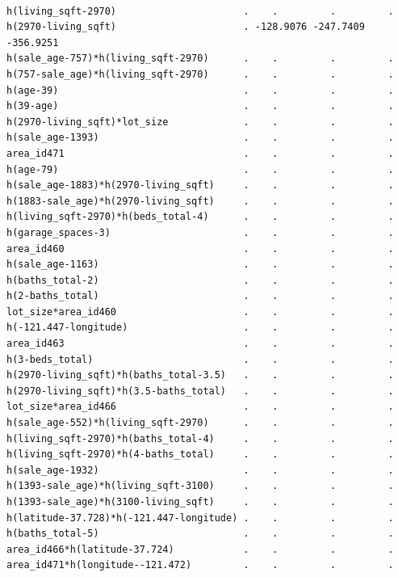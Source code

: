 \documentclass[
]{article}
\begin{document}
\begin{verbatim}
                                                                        
h(living_sqft-2970)                      .    .         .         .     
h(2970-living_sqft)                      . -128.9076 -247.7409 -356.9251
h(sale_age-757)*h(living_sqft-2970)      .    .         .         .     
h(757-sale_age)*h(living_sqft-2970)      .    .         .         .     
h(age-39)                                .    .         .         .     
h(39-age)                                .    .         .         .     
h(2970-living_sqft)*lot_size             .    .         .         .     
h(sale_age-1393)                         .    .         .         .     
area_id471                               .    .         .         .     
h(age-79)                                .    .         .         .     
h(sale_age-1883)*h(2970-living_sqft)     .    .         .         .     
h(1883-sale_age)*h(2970-living_sqft)     .    .         .         .     
h(living_sqft-2970)*h(beds_total-4)      .    .         .         .     
h(garage_spaces-3)                       .    .         .         .     
area_id460                               .    .         .         .     
h(sale_age-1163)                         .    .         .         .     
h(baths_total-2)                         .    .         .         .     
h(2-baths_total)                         .    .         .         .     
lot_size*area_id460                      .    .         .         .     
h(-121.447-longitude)                    .    .         .         .     
area_id463                               .    .         .         .     
h(3-beds_total)                          .    .         .         .     
h(2970-living_sqft)*h(baths_total-3.5)   .    .         .         .     
h(2970-living_sqft)*h(3.5-baths_total)   .    .         .         .     
lot_size*area_id466                      .    .         .         .     
h(sale_age-552)*h(living_sqft-2970)      .    .         .         .     
h(living_sqft-2970)*h(baths_total-4)     .    .         .         .     
h(living_sqft-2970)*h(4-baths_total)     .    .         .         .     
h(sale_age-1932)                         .    .         .         .     
h(1393-sale_age)*h(living_sqft-3100)     .    .         .         .     
h(1393-sale_age)*h(3100-living_sqft)     .    .         .         .     
h(latitude-37.728)*h(-121.447-longitude) .    .         .         .     
h(baths_total-5)                         .    .         .         .     
area_id466*h(latitude-37.724)            .    .         .         .     
area_id471*h(longitude--121.472)         .    .         .         .     
                                                                         

\end{verbatim}
\end{document}
